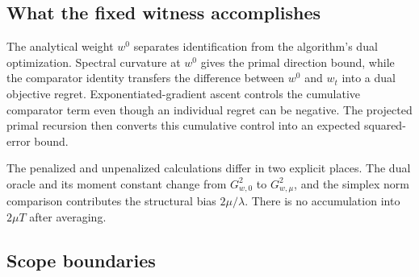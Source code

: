 \subsection{What the fixed witness accomplishes}

The analytical weight $w^0$ separates identification from the algorithm's
dual optimization.  Spectral curvature at $w^0$ gives the primal direction
bound, while the comparator identity transfers the difference between $w^0$
and $w_t$ into a dual objective regret.  Exponentiated-gradient ascent controls
the cumulative comparator term even though an individual regret can be
negative.  The projected primal recursion then converts this cumulative
control into an expected squared-error bound.

The penalized and unpenalized calculations differ in two explicit places.
The dual oracle and its moment constant change from $G_{w,0}^2$ to
$G_{w,\mu}^2$, and the simplex norm comparison contributes the structural
bias $2\mu/\lambda$.  There is no accumulation into $2\mu T$ after averaging.

\subsection{Scope boundaries}

